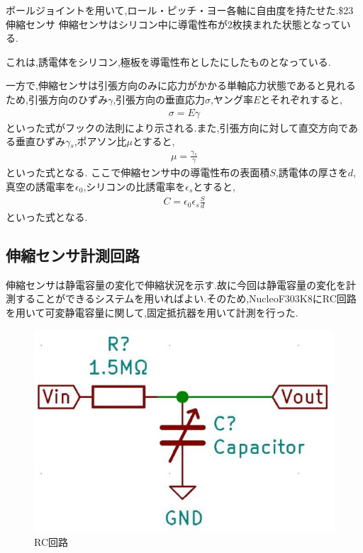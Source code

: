 ボールジョイントを用いて,ロール・ピッチ・ヨー各軸に自由度を持たせた.\$23伸縮センサ
伸縮センサはシリコン中に導電性布が2枚挟まれた状態となっている.

これは,誘電体をシリコン,極板を導電性布としたにしたものとなっている.

一方で,伸縮センサは引張方向のみに応力がかかる単軸応力状態であると見れるため,引張方向のひずみ$\gamma$,引張方向の垂直応力$\sigma$,ヤング率$E$とそれぞれすると,
\begin{eqnarray}
    \sigma=E\gamma
    \label{フックの法則}
\end{eqnarray}
といった式がフックの法則により示される.また,引張方向に対して直交方向である垂直ひずみ$\gamma{}_s$,ポアソン比$\mu$とすると,
\begin{eqnarray}
    \mu = \frac{\gamma{}_s}{\gamma}
    \label{ポアソン比}
\end{eqnarray}
といった式となる.
ここで伸縮センサ中の導電性布の表面積$S$,誘電体の厚さを$d$,真空の誘電率を$\epsilon{}_0$,シリコンの比誘電率を$\epsilon{}_s$とすると,
\begin{eqnarray}
    C=\epsilon{}_0\epsilon{}_s\frac{S}{d}
\end{eqnarray}
といった式となる.

\subsection{伸縮センサ計測回路}
伸縮センサは静電容量の変化で伸縮状況を示す.故に今回は静電容量の変化を計測することができるシステムを用いればよい.そのため,NucleoF303K8にRC回路を用いて可変静電容量に関して,固定抵抗器を用いて計測を行った.

\begin{figure}[h]
 \begin{center}
  \includegraphics[width=0.5\columnwidth,clip]{Photo/BackGround/RC.eps}
  \caption{RC回路}
  \label{RC}
 \end{center}
\end{figure}

